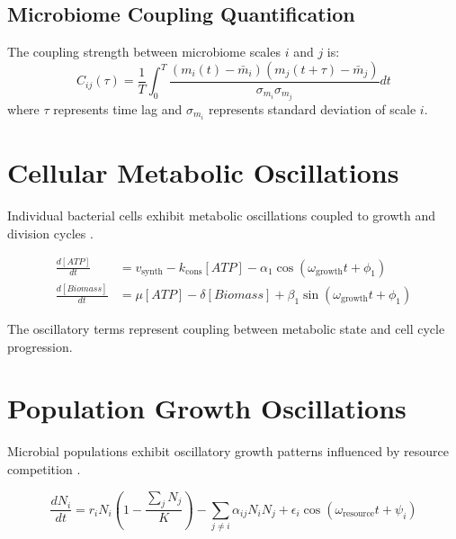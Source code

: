 \documentclass[twocolumn]{article}
\begin{document}
\subsection{Microbiome Coupling Quantification}

\begin{definition}
The coupling strength between microbiome scales $i$ and $j$ is:
\begin{equation}
C_{ij}(\tau) = \frac{1}{T} \int_0^T \frac{(m_i(t) - \bar{m}_i)(m_j(t+\tau) - \bar{m}_j)}{\sigma_{m_i}\sigma_{m_j}} dt
\label{eq:microbiome_coupling}
\end{equation}
where $\tau$ represents time lag and $\sigma_{m_i}$ represents standard deviation of scale $i$.
\end{definition}

\section{Cellular Metabolic Oscillations}

Individual bacterial cells exhibit metabolic oscillations coupled to growth and division cycles \citep{murray2007temporal,kiviet2014stochasticity}.

\begin{align}
\frac{d[ATP]}{dt} &= v_{\text{synth}} - k_{\text{cons}}[ATP] - \alpha_1 \cos(\omega_{\text{growth}}t + \phi_1) \label{eq:atp} \\
\frac{d[Biomass]}{dt} &= \mu[ATP] - \delta[Biomass] + \beta_1 \sin(\omega_{\text{growth}}t + \phi_1) \label{eq:biomass}
\end{align}

The oscillatory terms represent coupling between metabolic state and cell cycle progression.

\section{Population Growth Oscillations}

Microbial populations exhibit oscillatory growth patterns influenced by resource competition \citep{stein2013ecological,coyte2015ecology}.

\begin{equation}
\frac{dN_i}{dt} = r_i N_i \left(1 - \frac{\sum_j N_j}{K}\right) - \sum_{j \neq i} \alpha_{ij} N_i N_j + \epsilon_i \cos(\omega_{\text{resource}}t + \psi_i)
\label{eq:population_dynamics}
\end{equation}
\end{document}
